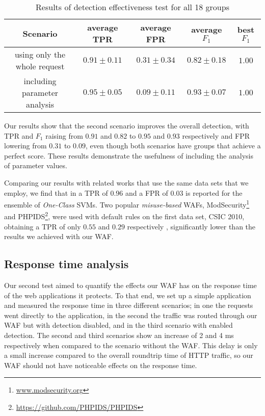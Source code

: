 \begin{table}[!b]
    \centering
    \caption{Results of detection effectiveness test for all 18 groups}
    \label{tbl:test_1_results}

    \small
    \begin{tabularx}{\linewidth}{|C|c|c|c|c|}
        \hline
        Scenario                     & average TPR   & average FPR   & average $F_{1}$ & best $F_{1}$ \\ \hline
        using only the whole request & $0.91 \pm 0.11$ & $0.31 \pm 0.34$ & $0.82 \pm 0.18$ & $1.00$       \\ \hline
        including parameter analysis & $0.95 \pm 0.05$ & $0.09 \pm 0.11$ & $0.93 \pm 0.07$ & $1.00$       \\ \hline
    \end{tabularx}
\end{table}

Our results show that the second scenario improves the overall detection,
with TPR and $F_{1}$ raising from $0.91$ and $0.82$ to $0.95$ and $0.93$
respectively and FPR lowering from $0.31$ to $0.09$, even though both
scenarios have groups that achieve a perfect score.
These results demonstrate the usefulness of including the analysis of
parameter values.

Comparing our results with related works that use the same data sets that
we employ, we find that in \cite{parhizkar2015oc} a TPR of $0.96$ and a
FPR of $0.03$ is reported for the ensemble of \textit{One-Class} SVMs.
Two popular \textit{misuse-based} WAFs,
ModSecurity\footnote{\url{www.modsecurity.org}}
and PHPIDS\footnote{\small \url{https://github.com/PHPIDS/PHPIDS}},
were used with default rules on the first data set, CSIC 2010, obtaining
a TPR of only $0.55$ and $0.29$ respectively \cite{gimenez2015paper},
significantly lower than the results we achieved with our WAF.


\subsection{Response time analysis}

Our second test aimed to quantify the effects our WAF has on the response
time of the web applications it protects. To that end, we set up a simple
application and measured the response time in three different scenarios;
in one the requests went directly to the application, in the second the
traffic was routed through our WAF but with detection disabled, and in
the third scenario with enabled detection.
The second and third scenarios show an increase of 2 and 4 ms respectively
when compared to the scenario without the WAF. This delay is only a small
increase compared to the overall roundtrip time of HTTP traffic, so our WAF
should not have noticeable effects on the response time.


